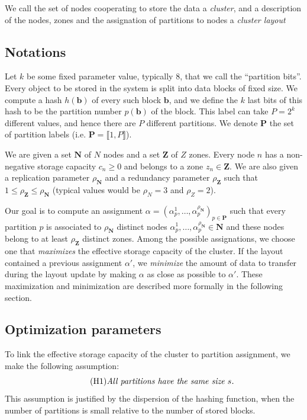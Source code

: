 \documentclass[]{article}
\begin{document}
We call the set of nodes cooperating to store the data a \emph{cluster}, and a description of the nodes, zones and the assignation of partitions to nodes a \emph{cluster layout}

\subsection{Notations}

Let $k$ be some fixed parameter value, typically 8, that we call the ``partition bits''.
Every object to be stored in the system is split into data blocks of fixed size. We compute a hash $h(\mathbf{b})$ of every such block $\mathbf{b}$, and we define the $k$ last bits of this hash to be the partition number $p(\mathbf{b})$ of the block. This label can take $P=2^k$ different values, and hence there are $P$ different partitions. We denote $\mathbf{P}$ the set of partition labels (i.e. $\mathbf{P}=\llbracket1,P\rrbracket$).

We are given a set $\mathbf{N}$ of $N$ nodes  and a set  $\mathbf{Z}$ of $Z$ zones. Every node $n$ has a non-negative storage capacity $c_n\ge 0$ and belongs to a zone $z_n\in \mathbf{Z}$. We are also given a replication parameter $\rho_\mathbf{N}$ and a redundancy parameter $\rho_\mathbf{Z}$ such that  $1\le \rho_\mathbf{Z} \le \rho_\mathbf{N}$ (typical values would be $\rho_N=3$ and $\rho_Z=2$).

Our goal is to compute an assignment $\alpha = (\alpha_p^1, \ldots, \alpha_p^{\rho_\mathbf{N}})_{p\in \mathbf{P}}$ such that every partition $p$ is associated to $\rho_\mathbf{N}$ distinct nodes $\alpha_p^1, \ldots, \alpha_p^{\rho_\mathbf{N}} \in \mathbf{N}$ and these nodes belong to at least $\rho_\mathbf{Z}$ distinct zones. Among the possible assignations, we choose one that \emph{maximizes} the effective storage capacity of the cluster. If the layout contained a previous assignment $\alpha'$, we \emph{minimize} the amount of data to transfer during the layout update by making $\alpha$ as close as possible to $\alpha'$. These maximization and minimization are described more formally in the following section.

\subsection{Optimization parameters}

To link the effective storage capacity of the cluster to partition assignment, we make the following assumption:
\begin{equation}
	\tag{H1}
	\text{\emph{All partitions have the same size $s$.}}
\end{equation}
This assumption is justified by the dispersion of the hashing function, when the number of partitions is small relative to the number of stored blocks.
\end{document}
